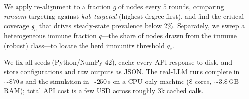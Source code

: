  We apply re-alignment to a fraction $g$ of nodes every $5$
rounds, comparing \emph{random} targeting against \emph{hub-targeted} (highest
degree first), and find the critical coverage $g_c$ that drives steady-state
prevalence below $2\%$. Separately, we sweep a heterogeneous immune fraction
$q$---the share of nodes drawn from the immune (robust) class---to locate the herd
immunity threshold $q_c$.

 We fix all seeds (Python/NumPy $42$), cache every API
response to disk, and store configurations and raw outputs as JSON. The real-LLM
runs complete in ${\sim}870$\,s and the simulation in ${\sim}250$\,s on a CPU-only
machine ($8$ cores, ${\sim}3.8$\,GB RAM); total API cost is a few USD across
roughly $3$k cached calls.
